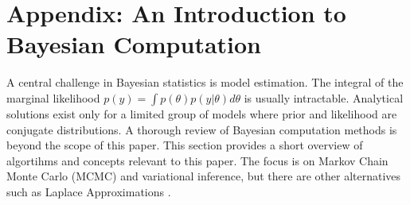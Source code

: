 \chapter{Appendix: An Introduction to Bayesian Computation}

\label{ch:computation}

A central challenge in Bayesian statistics is model estimation.
The integral of the marginal likelihood $p(y) = \int p(\theta)p(y|\theta)d\theta$ is usually intractable.
Analytical solutions exist only for a limited group of models where prior and likelihood are conjugate distributions.
A thorough review of Bayesian computation methods is beyond the scope of this paper.
This section provides a short overview of algortihms and concepts relevant to this paper.
The focus is on Markov Chain Monte Carlo (MCMC) and variational inference, but there are other alternatives such as Laplace Approximations \citep{gomez-rubio_bayesian_2020}.

